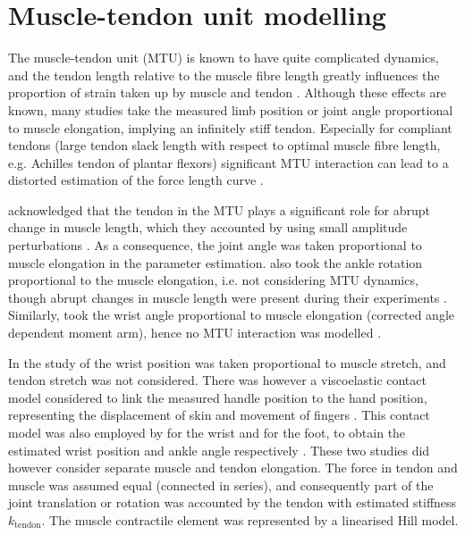 \section{Muscle-tendon unit modelling}
\label{sec:mtu_modeling}
The muscle-tendon unit (MTU) is known to have quite complicated dynamics, and the tendon length relative to the muscle fibre length greatly influences the proportion of strain taken up by muscle and tendon \cite{zajac_muscle_1989}. Although these effects are known, many studies take the measured limb position or joint angle proportional to muscle elongation, implying an infinitely stiff tendon. Especially for compliant tendons (large tendon slack length with respect to  optimal muscle fibre length, e.g. Achilles tendon of plantar flexors) significant MTU interaction can lead to a distorted estimation of the force length curve \cite{zajac_muscle_1989}. 

\citeauthor{zhang_simultaneous_1997} acknowledged that the tendon in the MTU plays a significant role for abrupt change in muscle length, which they accounted by using small amplitude perturbations \cite{zhang_simultaneous_1997}. As a consequence, the joint angle was taken proportional to muscle elongation in the parameter estimation. \citeauthor{mirbagheri_intrinsic_2000} also took the ankle rotation proportional to the muscle elongation, i.e. not considering MTU dynamics, though abrupt changes in muscle length were present during their experiments \cite{mirbagheri_intrinsic_2000}. Similarly, \citeauthor{de_gooijer-van_de_groep_estimation_2016} took the wrist angle proportional to muscle elongation (corrected angle dependent moment arm), hence no MTU interaction was modelled \cite{de_gooijer-van_de_groep_estimation_2016}. 

In the study of \citeauthor{van_der_helm_identification_2002} the wrist position was taken proportional to muscle stretch, and tendon stretch was not considered. There was however a viscoelastic contact model considered to link the measured handle position to the hand position, representing the displacement of skin and movement of fingers \cite{van_der_helm_identification_2002}. This contact model was also employed by \citeauthor{schouten_nmclab_2008} for the wrist and \citeauthor{mugge_rigorous_2010} for the foot, to obtain the estimated wrist position and ankle angle respectively \cite{schouten_nmclab_2008,mugge_rigorous_2010}. These two studies did however consider separate muscle and tendon elongation. The force in tendon and muscle was assumed equal (connected in series), and consequently part of the joint translation or rotation was accounted by the tendon with estimated stiffness $k_\text{tendon}$. The muscle contractile element was represented by a linearised Hill model. 



